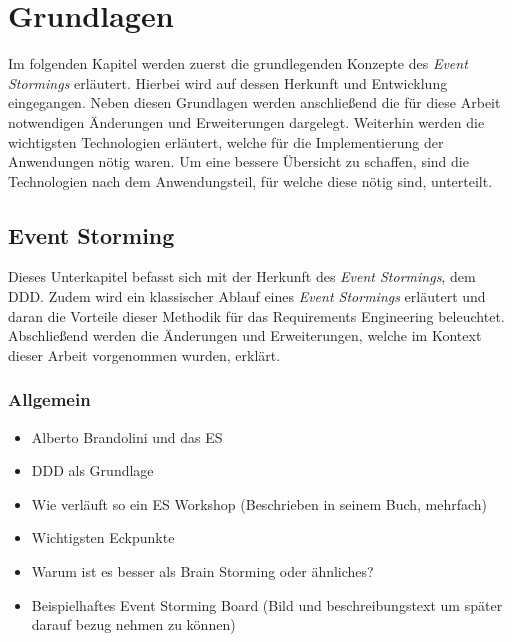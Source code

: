 \chapter{Grundlagen}\label{ch:technologien}
Im folgenden Kapitel werden zuerst die grundlegenden Konzepte des \textit{Event Stormings} erläutert.
Hierbei wird auf dessen Herkunft und Entwicklung eingegangen.
Neben diesen Grundlagen werden anschließend die für diese Arbeit notwendigen Änderungen und Erweiterungen dargelegt.
Weiterhin werden die wichtigsten Technologien erläutert, welche für die Implementierung der Anwendungen nötig waren.
Um eine bessere Übersicht zu schaffen, sind die Technologien nach dem Anwendungsteil, für welche diese nötig sind, unterteilt.

\section{Event Storming}\label{sec:event-storming}
Dieses Unterkapitel befasst sich mit der Herkunft des \textit{Event Stormings}, dem \ac*{DDD}.
Zudem wird ein klassischer Ablauf eines \textit{Event Stormings} erläutert und daran die Vorteile dieser Methodik für das Requirements Engineering beleuchtet.
Abschließend werden die Änderungen und Erweiterungen, welche im Kontext dieser Arbeit vorgenommen wurden, erklärt.

\subsection{Allgemein}\label{subsec:allgemein}
\begin{itemize}
    \item Alberto Brandolini und das ES
    \item DDD als Grundlage
    \item Wie verläuft so ein ES Workshop (Beschrieben in seinem Buch, mehrfach)
    \item Wichtigsten Eckpunkte
    \item Warum ist es besser als Brain Storming oder ähnliches?
    \item Beispielhaftes Event Storming Board (Bild und beschreibungstext um später darauf bezug nehmen zu können)
\end{itemize}

